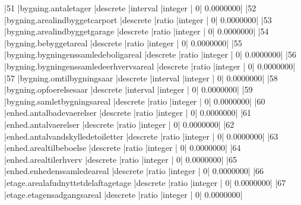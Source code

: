\documentclass{report}
\begin{document}
\begin{Schunk}
\begin{Soutput}
|51  |bygning.antaletager                                           |descrete           |interval       |integer         |              0|          0.0000000|
|52  |bygning.arealindbyggetcarport                                 |descrete           |ratio          |integer         |              0|          0.0000000|
|53  |bygning.arealindbyggetgarage                                  |descrete           |ratio          |integer         |              0|          0.0000000|
|54  |bygning.bebyggetareal                                         |descrete           |ratio          |integer         |              0|          0.0000000|
|55  |bygning.bygningenssamledeboligareal                           |descrete           |ratio          |integer         |              0|          0.0000000|
|56  |bygning.bygningenssamledeerhvervsareal                        |descrete           |ratio          |integer         |              0|          0.0000000|
|57  |bygning.omtilbygningsaar                                      |descrete           |interval       |integer         |              0|          0.0000000|
|58  |bygning.opfoerelsesaar                                        |descrete           |interval       |integer         |              0|          0.0000000|
|59  |bygning.samletbygningsareal                                   |descrete           |ratio          |integer         |              0|          0.0000000|
|60  |enhed.antalbadevaerelser                                      |descrete           |ratio          |integer         |              0|          0.0000000|
|61  |enhed.antalvaerelser                                          |descrete           |ratio          |integer         |              0|          0.0000000|
|62  |enhed.antalvandskylledetoiletter                              |descrete           |ratio          |integer         |              0|          0.0000000|
|63  |enhed.arealtilbeboelse                                        |descrete           |ratio          |integer         |              0|          0.0000000|
|64  |enhed.arealtilerhverv                                         |descrete           |ratio          |integer         |              0|          0.0000000|
|65  |enhed.enhedenssamledeareal                                    |descrete           |ratio          |integer         |              0|          0.0000000|
|66  |etage.arealafudnyttetdelaftagetage                            |descrete           |ratio          |integer         |              0|          0.0000000|
|67  |etage.etagensadgangsareal                                     |descrete           |ratio          |integer         |              0|          0.0000000|

\end{Soutput}
\end{Schunk}
\end{document}
